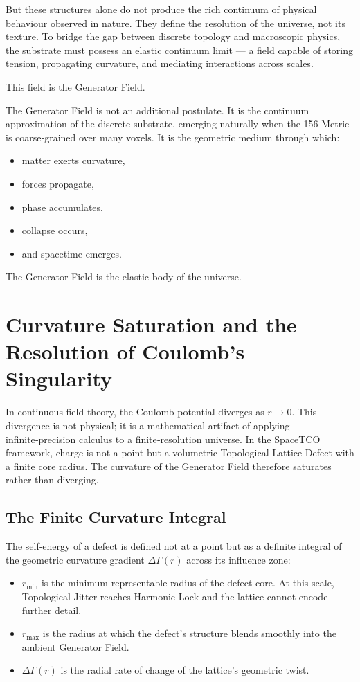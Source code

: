 \documentclass[reprint,amsmath,amssymb,aps,prl,floatfix]{revtex4-2}
\begin{document}
\begin{itemize}
But these structures alone do not produce the rich continuum of physical behaviour observed in nature. They define the resolution of the universe, not its texture. To bridge the gap between discrete topology and macroscopic physics, the substrate must possess an elastic continuum limit — a field capable of storing tension, propagating curvature, and mediating interactions across scales.
\medskip

This field is the Generator Field.
\medskip

The Generator Field is not an additional postulate.  
It is the continuum approximation of the discrete substrate, emerging naturally when the 156‑Metric is coarse‑grained over many voxels. It is the geometric medium through which:
\begin{itemize}
\item matter exerts curvature,  
\item forces propagate,  
\item phase accumulates,  
\item collapse occurs,  
\item and spacetime emerges.
\end{itemize}
\medskip

The Generator Field is the elastic body of the universe.

\section{Curvature Saturation and the Resolution of Coulomb’s Singularity}

In continuous field theory, the Coulomb potential diverges as \( r \to 0 \). This divergence is not physical; it is a mathematical artifact of applying infinite‑precision calculus to a finite‑resolution universe. In the SpaceTCO framework, charge is not a point but a volumetric Topological Lattice Defect with a finite core radius. The curvature of the Generator Field therefore saturates rather than diverging.

\subsection{The Finite Curvature Integral}

The self‑energy of a defect is defined not at a point but as a definite integral of the geometric curvature gradient \(\Delta\Gamma(r)\) across its influence zone:
\begin{itemize}
\item \textbf{\(r_{\min}\)} is the minimum representable radius of the defect core. At this scale, Topological Jitter reaches Harmonic Lock and the lattice cannot encode further detail.  
\item \textbf{\(r_{\max}\)} is the radius at which the defect’s structure blends smoothly into the ambient Generator Field.  
\item \textbf{\(\Delta\Gamma(r)\)} is the radial rate of change of the lattice’s geometric twist.
\end{itemize}


\end{itemize}
\end{document}
